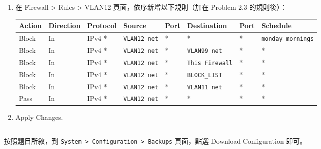 \documentclass[12pt]{article}
\begin{document}
\begin{enumerate}
  \item 在 Firewall > Rules > VLAN12 頁面，依序新增以下規則（加在 Problem 2.3 的規則後）：
    \begin{table}[H]
      \centering
      \small
      \begin{tabular}{llllllll}
        \toprule
        \textbf{Action} & \textbf{Direction} & \textbf{Protocol} & \textbf{Source} & \textbf{Port} & \textbf{Destination} & \textbf{Port} & \textbf{Schedule} \\
        \midrule
        Block & In & IPv4 * & \texttt{VLAN12 net} & * & * & * & \texttt{monday\_mornings} \\
        Block & In & IPv4 * & \texttt{VLAN12 net} & * & \texttt{VLAN99 net} & * & * \\
        Block & In & IPv4 * & \texttt{VLAN12 net} & * & \texttt{This Firewall} & * & * \\
        Block & In & IPv4 * & \texttt{VLAN12 net} & * & \texttt{BLOCK\_LIST} & * & * \\
        Block & In & IPv4 * & \texttt{VLAN12 net} & * & \texttt{VLAN11 net} & * & * \\
        Pass & In & IPv4 * & \texttt{VLAN12 net} & * & * & * & * \\
        \bottomrule
      \end{tabular}
    \end{table}
  \item Apply Changes.
\end{enumerate}
\subsection{}
按照題目所敘，到 \texttt{System > Configuration > Backups} 頁面，點選 Download Configuration 即可。

\end{document}
